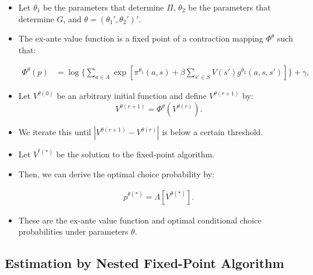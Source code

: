 \documentclass[]{book}
\providecommand{\tightlist}{%
  \setlength{\itemsep}{0pt}\setlength{\parskip}{0pt}}
\begin{document}
\begin{itemize}
\tightlist
\item
  Let \(\theta_1\) be the parameters that determine \(\Pi\),
  \(\theta_2\) be the parameters that determine \(G\), and
  \(\theta = (\theta_1', \theta_2')'\).
\item
  The ex-ante value function is a fixed point of a contraction mapping
  \(\Phi^\theta\) such that:

  \begin{equation}
  \begin{split}
  \Phi^\theta(p) &=\log \Bigg\{\sum_{a \in A} \exp[\pi^{\theta_1}(a , s) + \beta \sum_{s' \in S} V(s') g^{\theta_2}(a, s, s')] \Bigg\} + \gamma,
  \end{split}
  \end{equation}
\item
  Let \(V^{\theta (0)}\) be an arbitrary initial function and define
  \(V^{\theta (r + 1)}\) by: \[
  V^{\theta (r + 1)} = \Phi^{\theta}(V^{\theta (r)}).
  \]
\item
  We iterate this until \(|V^{\theta (r + 1)} - V^{\theta (r)}|\) is
  below a certain threshold.
\item
  Let \(V^{^\theta (\ast)}\) be the solution to the fixed-point
  algorithm.
\item
  Then, we can derive the optimal choice probability by:

  \begin{equation}
  \begin{split}
  p^{\theta (\ast)} = \Lambda\left[V^{\theta (\ast)}\right].
  \end{split}
  \end{equation}
\item
  These are the ex-ante value function and optimal conditional choice
  probabilities under parameters \(\theta\).
\end{itemize}

\subsection{Estimation by Nested Fixed-Point
Algorithm}\label{estimation-by-nested-fixed-point-algorithm-1}
\end{document}
